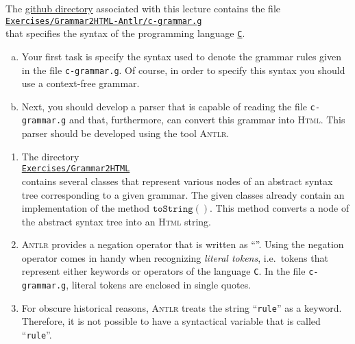 \exerciseEng
The \href{https://github.com/karlstroetmann/Formal-Languages}{github directory} associated with this lecture
contains the file
\\[0.2cm]
\hspace*{1.3cm}
\href{https://github.com/karlstroetmann/Formal-Languages/tree/master/Exercises/Grammar2HTML-Antlr/c-grammar.g}{
\texttt{Exercises/Grammar2HTML-Antlr/c-grammar.g}}
\\[0.2cm]
that specifies the syntax of the programming language 
\href{https://en.wikipedia.org/wiki/C_(programming_language)}{\texttt{C}}.

\begin{enumerate}[(a)]
\item Your first task is specify the syntax used to denote the grammar rules given in the file
      \texttt{c-grammar.g}.  Of course, in order to specify this syntax you should use a
      context-free grammar. 
\item Next, you should develop a parser that is capable of reading the file \texttt{c-grammar.g}
      and that, furthermore, can convert this grammar into \textsc{Html}. 
      This parser should be developed using the tool \textsc{Antlr}.
\end{enumerate}

\remarkEng
\begin{enumerate}
\item The directory 
      \\[0.2cm]
      \hspace*{1.3cm}
      \href{https://github.com/karlstroetmann/Formal-Languages/tree/master/Exercises/Grammar2HTML/}{\texttt{Exercises/Grammar2HTML}}
      \\[0.2cm]
      contains several classes that represent various nodes of an abstract syntax tree corresponding to a
      given grammar.  The given classes already contain an implementation of the method $\texttt{toString}()$. This method 
      converts a node of the abstract syntax tree into an \textsc{Html} string.
\item \textsc{Antlr} provides a negation operator that is written as ``\texttt{}''.
      Using the negation operator comes in handy when recognizing \emph{literal tokens},  
      i.e.~tokens that represent either keywords or operators of the language \texttt{C}.  In the
      file \texttt{c-grammar.g}, literal tokens are enclosed in single quotes.
\item For obscure historical reasons, \textsc{Antlr} treats the string ``\texttt{rule}'' as a 
      keyword.  Therefore, it is not possible to have a syntactical variable that is called
      ``\texttt{rule}''. 
\end{enumerate}



